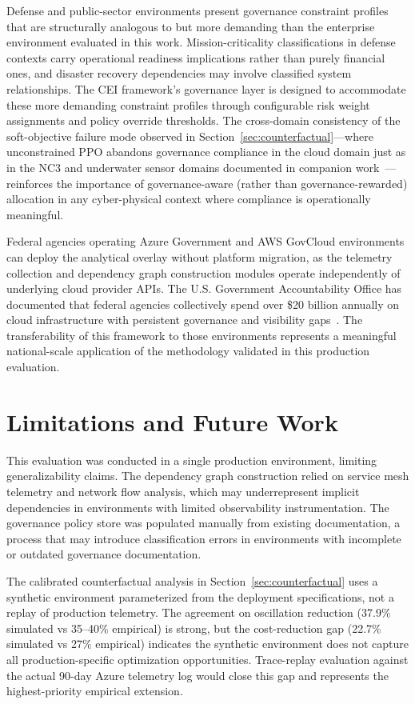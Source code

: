 \documentclass[runningheads]{llncs}
\begin{document}
Defense and public-sector environments present governance constraint profiles that are structurally analogous to but more demanding than the enterprise environment evaluated in this work. Mission-criticality classifications in defense contexts carry operational readiness implications rather than purely financial ones, and disaster recovery dependencies may involve classified system relationships. The CEI framework's governance layer is designed to accommodate these more demanding constraint profiles through configurable risk weight assignments and policy override thresholds. The cross-domain consistency of the soft-objective failure mode observed in Section~\ref{sec:counterfactual}---where unconstrained PPO abandons governance compliance in the cloud domain just as in the NC3 and underwater sensor domains documented in companion work~\cite{paper1,paper2}---reinforces the importance of governance-aware (rather than governance-rewarded) allocation in any cyber-physical context where compliance is operationally meaningful.

Federal agencies operating Azure Government and AWS GovCloud environments can deploy the analytical overlay without platform migration, as the telemetry collection and dependency graph construction modules operate independently of underlying cloud provider APIs. The U.S. Government Accountability Office has documented that federal agencies collectively spend over \$20 billion annually on cloud infrastructure with persistent governance and visibility gaps~\cite{gao_cloud1,gao_cloud2}. The transferability of this framework to those environments represents a meaningful national-scale application of the methodology validated in this production evaluation.

\section{Limitations and Future Work}
\label{sec:limitations}

This evaluation was conducted in a single production environment, limiting generalizability claims. The dependency graph construction relied on service mesh telemetry and network flow analysis, which may underrepresent implicit dependencies in environments with limited observability instrumentation. The governance policy store was populated manually from existing documentation, a process that may introduce classification errors in environments with incomplete or outdated governance documentation.

The calibrated counterfactual analysis in Section~\ref{sec:counterfactual} uses a synthetic environment parameterized from the deployment specifications, not a replay of production telemetry. The agreement on oscillation reduction (37.9\% simulated vs 35--40\% empirical) is strong, but the cost-reduction gap (22.7\% simulated vs 27\% empirical) indicates the synthetic environment does not capture all production-specific optimization opportunities. Trace-replay evaluation against the actual 90-day Azure telemetry log would close this gap and represents the highest-priority empirical extension.
\end{document}
